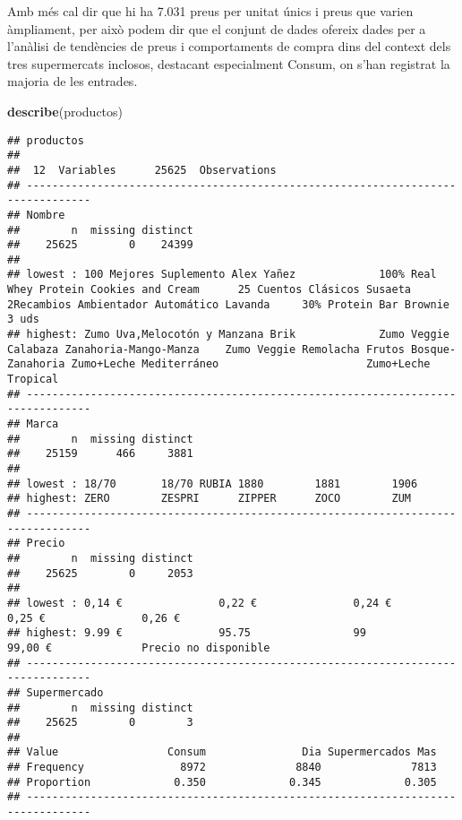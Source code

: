 \documentclass[
]{article}
\newenvironment{Shaded}{\begin{snugshade}}{\end{snugshade}}
\newcommand{\FunctionTok}[1]{\textcolor[rgb]{0.13,0.29,0.53}{\textbf{#1}}}
\newcommand{\NormalTok}[1]{#1}
\begin{document}
Amb més cal dir que hi ha 7.031 preus per unitat únics i preus que
varien àmpliament, per això podem dir que el conjunt de dades ofereix
dades per a l'anàlisi de tendències de preus i comportaments de compra
dins del context dels tres supermercats inclosos, destacant especialment
Consum, on s'han registrat la majoria de les entrades.

\begin{Shaded}
\begin{Highlighting}[]
\FunctionTok{describe}\NormalTok{(productos)}
\end{Highlighting}
\end{Shaded}

\begin{verbatim}
## productos 
## 
##  12  Variables      25625  Observations
## --------------------------------------------------------------------------------
## Nombre 
##        n  missing distinct 
##    25625        0    24399 
## 
## lowest : 100 Mejores Suplemento Alex Yañez             100% Real Whey Protein Cookies and Cream      25 Cuentos Clásicos Susaeta                   2Recambios Ambientador Automático Lavanda     30% Protein Bar Brownie 3 uds                
## highest: Zumo Uva,Melocotón y Manzana Brik             Zumo Veggie Calabaza Zanahoria-Mango-Manza    Zumo Veggie Remolacha Frutos Bosque-Zanahoria Zumo+Leche Mediterráneo                       Zumo+Leche Tropical                          
## --------------------------------------------------------------------------------
## Marca 
##        n  missing distinct 
##    25159      466     3881 
## 
## lowest : 18/70       18/70 RUBIA 1880        1881        1906       
## highest: ZERO        ZESPRI      ZIPPER      ZOCO        ZUM        
## --------------------------------------------------------------------------------
## Precio 
##        n  missing distinct 
##    25625        0     2053 
## 
## lowest : 0,14 €               0,22 €               0,24 €               0,25 €               0,26 €              
## highest: 9.99 €               95.75                99                   99,00 €              Precio no disponible
## --------------------------------------------------------------------------------
## Supermercado 
##        n  missing distinct 
##    25625        0        3 
##                                                                 
## Value                 Consum               Dia Supermercados Mas
## Frequency               8972              8840              7813
## Proportion             0.350             0.345             0.305
## --------------------------------------------------------------------------------

\end{verbatim}
\end{document}

